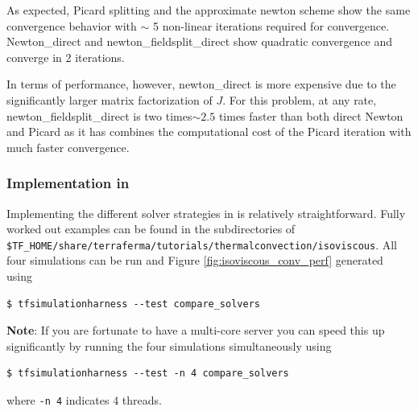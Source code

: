 As expected, Picard splitting and the approximate newton scheme show
the same convergence behavior with $\sim$ 5 non-linear iterations
required for convergence.  Newton\_direct and
newton\_fieldsplit\_direct show quadratic convergence and converge in
2 iterations. 

In terms of performance, however, newton\_direct is more expensive due
to the significantly larger matrix factorization of $J$.  For this
problem, at any rate,  newton\_fieldsplit\_direct is two
times$\sim2.5$ times  faster than both direct Newton and Picard as it has combines the
computational cost of the Picard iteration with much faster
convergence. 


\subsubsection*{Implementation in \TF}
\label{sec:implementation-tf}

Implementing the different solver strategies in \TF{} is relatively
straightforward. Fully worked out examples can be found in the
subdirectories of
\texttt{\$TF\_HOME/share/terraferma/tutorials/thermalconvection/isoviscous}. All
four simulations can be run and Figure \ref{fig:isoviscous_conv_perf}
generated using
\begin{lstlisting}[style=Bash]
  $ tfsimulationharness --test compare_solvers
\end{lstlisting} %
\textbf{Note}: If you are fortunate to have a multi-core server you
can speed this up significantly by running the four simulations
simultaneously using 
\begin{lstlisting}[style=Bash]
  $ tfsimulationharness --test -n 4 compare_solvers
\end{lstlisting} %
where \texttt{-n 4} indicates 4 threads.

